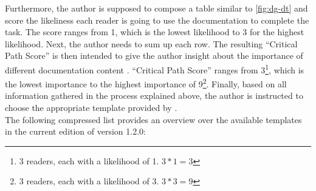 \noindent
Furthermore, the author is supposed to compose a table similar to \cref{fig:dg-dt} and score the likeliness each reader is
going to use the documentation to complete the task.
The score ranges from 1, which is the lowest likelihood to 3 for the highest likelihood.
Next, the author needs to sum up each row.
The resulting ``Critical Path Score'' is then intended to give the author insight about the importance of different documentation
content \cite{shorterGoodDocsProject2024}.
``Critical Path Score'' ranges from 3\footnote{3 readers, each with a likelihood of 1. $3*1=3$},
which is the lowest importance to the highest importance of 9\footnote{3 readers, each with a likelihood of 3. $3*3=9$}.
Finally, based on all information gathered in the process explained above, the author is instructed to choose the appropriate template provided by \good\space \cite{shorterGoodDocsProject2024}.\\
The following compressed list provides an overview over the available templates in the current edition of \good\space version 1.2.0:
